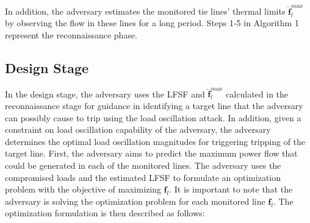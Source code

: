 \documentclass[journal]{IEEEtran}
\begin{document}
In addition, the adversary estimates the monitored tie lines' thermal limits $\mathbf{\hat{f}}_{l}^{max}$ by observing the flow in these lines for a long period. 
Steps 1-5 in Algorithm 1 represent the reconnaissance phase.

 

\subsection{Design Stage}
In the design stage, the adversary uses the LFSF and $\mathbf{\hat{f}}_{l}^{max}$ calculated in the reconnaissance stage for guidance in identifying a target line that the adversary can possibly cause to trip using the load oscillation attack. In addition, given a constraint on load oscillation capability of the adversary, the adversary determines the optimal load oscillation magnitudes for triggering tripping of the target line. First, the adversary aims to predict the maximum power flow that could be generated in each of the monitored lines. The adversary uses the compromised loads and the estimated LFSF to formulate an optimization problem with the objective of maximizing $ \mathbf{f}_l$. It is important to note that the adversary is solving the optimization problem for each monitored line $ \mathbf{f}_l$. The optimization formulation is then described as follows:
\end{document}
